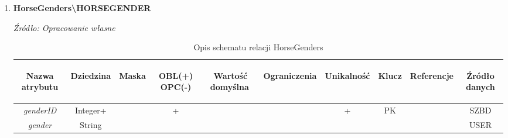 \documentclass[12pt,oneside]{report}
\begin{document}
\begin{enumerate}[start=10,label={\bfseries REL\textbackslash\arabic*}]
	\item \textbf{HorseGenders\textbackslash HORSEGENDER} 
	\begin{table}[H]
		\caption{Opis schematu relacji HorseGenders}
		\textit{Źródło: Opracowanie własne}
		\label{HorseGendersRelationSchema}
		\centering
		\begin{tabular}{|c|c|c|c|c|c|c|c|c|c|}
			\hline
			\begin{sideways}Nazwa atrybutu\end{sideways}& 
			\begin{sideways}Dziedzina \end{sideways}& 
			\begin{sideways}Maska \end{sideways}& 
			\begin{sideways}OBL(+) OPC(-)\end{sideways} & 
			\begin{sideways}Wartość domyślna$\ $\end{sideways}& 
			\begin{sideways}Ograniczenia\end{sideways} &
			\begin{sideways}Unikalność \end{sideways}& 
			\begin{sideways}Klucz \end{sideways}& 
			\begin{sideways}Referencje \end{sideways}&
			\begin{sideways}Źródło danych\end{sideways}\\
			\hline
			\textit{genderID}&Integer+&&+&&&+&PK&&SZBD\\	
			\hline
			\textit{gender}&String&&&&&&&&USER\\
			\hline		
		\end{tabular}
	\end{table}
	

\end{enumerate}
\end{document}
